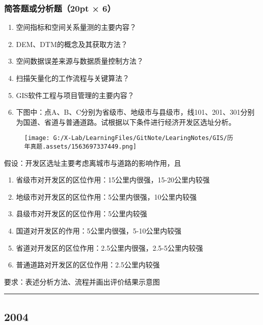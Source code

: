\documentclass[]{article}
\begin{document}
\hypertarget{header-n188}{%
\subsubsection{简答题或分析题（20pt × 6）}\label{header-n188}}

\begin{enumerate}
\def\labelenumi{\arabic{enumi}.}
\item
  空间指标和空间关系量测的主要内容？
\item
  DEM、DTM的概念及其获取方法？
\item
  空间数据误差来源与数据质量控制方法？
\item
  扫描矢量化的工作流程与关键算法？
\item
  GIS软件工程与项目管理的主要内容？
\item
  下图中：点A、B、C分别为省级市、地级市与县级市，线101、201、301分别为国道、省道与普通道路。试根据以下条件进行经济开发区选址分析。
\end{enumerate}

\begin{figure}
\centering
\texttt{[image: G:/X-Lab/LearningFiles/GitNote/LearingNotes/GIS/历年真题.assets/1563697337449.png]}
\caption{}
\end{figure}

假设：开发区选址主要考虑离城市与道路的影响作用，且

\begin{enumerate}
\def\labelenumi{\arabic{enumi}.}
\item
  省级市对开发区的区位作用：15公里内很强，15-20公里内较强
\item
  地级市对开发区的区位作用：5公里内很强，10公里内较强
\item
  县级市对开发区的区位作用：5公里内较强
\item
  国道对开发区的作用：5公里内很强，5-10公里内较强
\item
  省道对开发区的区位作用：2.5公里内很强，2.5-5公里内较强
\item
  普通道路对开发区的区位作用：2.5公里内较强
\end{enumerate}

要求：表述分析方法、流程并画出评价结果示意图

\begin{center}\rule{0.5\linewidth}{\linethickness}\end{center}

\hypertarget{header-n219}{%
\subsection{2004}\label{header-n219}}
\end{document}

